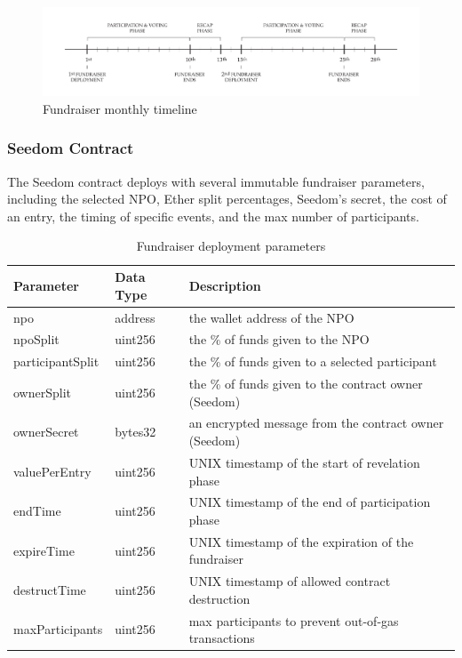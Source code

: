\documentclass[11pt]{article}
\begin{document}
\begin{figure}[H]
\begin{center}
\includegraphics[width=1.0\textwidth]{./graphics/fundraiser-monthly-timeline.pdf}
\caption{Fundraiser monthly timeline}
\label{figure:fundraiserMonthlyTimeline}
\end{center}
\end{figure}

\subsubsection{Seedom Contract}

The Seedom contract deploys with several immutable fundraiser parameters, including the selected NPO, Ether split percentages, Seedom's secret, the cost of an entry, the timing of specific events, and the max number of participants.

\begin{table}[H]
\begin{center}
\begin{tabular}{| l | l | l |}
\hline
\textbf{Parameter} & \textbf{Data Type} & \textbf{Description} \\ \hline
npo & address & the wallet address of the NPO \\ \hline
npoSplit & uint256 & the \% of funds given to the NPO \\ \hline
participantSplit & uint256 & the \% of funds given to a selected participant \\ \hline
ownerSplit & uint256 & the \% of funds given to the contract owner (Seedom) \\ \hline
ownerSecret & bytes32 & an encrypted message from the contract owner (Seedom) \\ \hline
valuePerEntry & uint256 & UNIX timestamp of the start of revelation phase \\ \hline
endTime & uint256 & UNIX timestamp of the end of participation phase \\ \hline
expireTime & uint256 & UNIX timestamp of the expiration of the fundraiser \\ \hline
destructTime & uint256 & UNIX timestamp of allowed contract destruction \\ \hline
maxParticipants & uint256 & max participants to prevent out-of-gas transactions \\ \hline
\end{tabular}
\caption{Fundraiser deployment parameters}
\label{tab:fundraiserDeploymentParameters}
\end{center}
\end{table}
\end{document}
